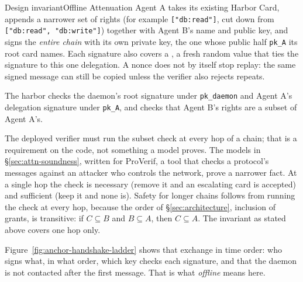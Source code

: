 \documentclass[11pt,a4paper]{article}
\theoremstyle{definition}
\begin{document}
%
\begin{pdclaim}{Design invariant}{Offline Attenuation}
\setlength{\parskip}{4pt plus 1pt}
\label{def:offline-attn}
Agent A takes its existing Harbor Card, appends a narrower set of rights (for example \texttt{["db:read"]}, cut down from \texttt{["db:read", "db:write"]}) together with Agent B's name and public key, and signs the \textit{entire chain} with its own private key, the one whose public half \texttt{pk\_A} its root card names. Each signature also covers a , a fresh random value that ties the signature to this one delegation. A nonce does not by itself stop replay: the same signed message can still be copied unless the verifier also rejects repeats.

The harbor checks the daemon's root signature under \texttt{pk\_daemon} and Agent A's delegation signature under \texttt{pk\_A}, and checks that Agent B's rights are a subset of Agent A's.

The deployed verifier must run the subset check at every hop of a chain; that is a requirement on the code, not something a model proves. The models in \S\ref{sec:attn-soundness}, written for ProVerif, a tool that checks a protocol's messages against an attacker who controls the network, prove a narrower fact. At a single hop the check is necessary (remove it and an escalating card is accepted) and sufficient (keep it and none is). Safety for longer chains follows from running the check at every hop, because the order of \S\ref{sec:architecture}, inclusion of grants, is transitive: if $C \subseteq B$ and $B \subseteq A$, then $C \subseteq A$. The invariant as stated above covers one hop only.
\end{pdclaim}

Figure~\ref{fig:anchor-handshake-ladder} shows that exchange in time order: who signs what, in what order, which key checks each signature, and that the daemon is not contacted after the first message. That is what \emph{offline} means here.


\end{document}
